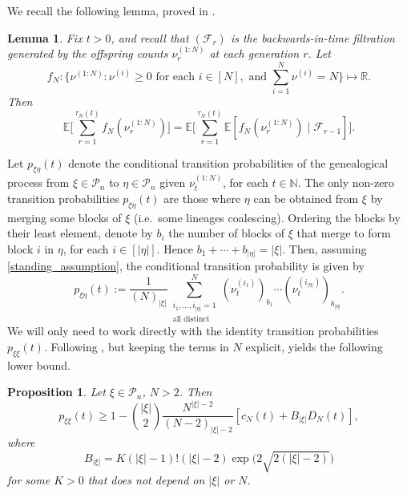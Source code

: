 \documentclass[12pt,authoryear]{article}
\newtheorem{lemma}{Lemma}
\newtheorem{prop}{Proposition}
\theoremstyle{definition}
\newcommand{\E}{\mathbb{E}}
\newcommand{\1}[1]{\mathbbm{1}_{#1}}
\begin{document}
We recall the following lemma, proved in \citet[Lemma 3.2]{brown2021thesis}.
\begin{lemma}\label{thm:kjjslemma2}
Fix $t>0$, and recall that $(\mathcal{F}_r)$ is the backwards-in-time filtration generated by the offspring counts $\nu_r^{(1:N)}$ at each generation $r$.
Let 
\begin{equation*}
    f_N : \Bigg\{ \nu^{(1:N)} : \nu^{(i)} \geq 0 \text{ for each } i \in [N], \text{ and } \sum_{ i = 1 }^N \nu^{(i)} = N \Bigg\} \mapsto \mathbb{R}.
\end{equation*}
Then 
\begin{equation*}
\E \Bigg[ \sum_{r=1}^{\tau_N(t)} f_N(\nu_r^{(1:N)}) \Bigg] 
= \E \Bigg[ \sum_{r=1}^{\tau_N(t)} \E [ f_N(\nu_r^{(1:N)}) \mid \mathcal{F}_{r-1} ] \Bigg] .
\end{equation*}
\end{lemma}

Let $p_{\xi\eta}(t)$ denote the conditional transition probabilities of the genealogical process from $\xi\in\mathcal{P}_n$ to $\eta\in\mathcal{P}_n$ given $\nu_t^{(1:N)}$, for each $t\in\mathbb{N}$.
The only non-zero transition probabilities $p_{\xi\eta}(t)$ are those where $\eta$ can be obtained from $\xi$ by merging some blocks of $\xi$ (i.e.\ some lineages coalescing).
Ordering the blocks by their least element, denote by $b_i$ the number of blocks of $\xi$ that merge to form block $i$ in $\eta$, for each $i \in [|\eta|]$. Hence $b_1 + \cdots + b_{|\eta|} = |\xi|$.
Then, assuming \ref{standing_assumption}, the conditional transition probability is given by
\begin{equation}\label{eq:defn_pxieta}
p_{\xi\eta}(t) 
:= \frac{1}{(N)_{|\xi|}} \sum_{\substack{i_1 , \ldots , i_{|\eta|} =1 
        \\ \text{all distinct} }}^N
        (\nu_t^{(i_1)})_{b_1} \cdots (\nu_t^{(i_{|\eta|})})_{b_{|\eta|}} .
\end{equation}
We will only need to work directly with the identity transition probabilities $p_{\xi\xi}(t)$.
Following \citet[Lemma 3.6]{brown2021}, but keeping the terms in $N$ explicit, yields the following lower bound.
\begin{prop}
\label{thm:pDelta_LB}
Let $\xi \in \mathcal{P}_n$, $N>2$. Then
\begin{equation*}
p_{\xi\xi}(t)
\geq 1 - \binom{|\xi|}{2} \frac{N^{|\xi|-2}}{(N-2)_{|\xi|-2}} \left[ c_N(t) + B_{|\xi|} D_N(t) \right],
\end{equation*}
where 
\begin{equation*}
B_{|\xi|} = K (|\xi|-1)! (|\xi|-2) \exp\big( 2 \sqrt{2(|\xi|-2)} \big)
\end{equation*}
for some $K>0$ that does not depend on $|\xi|$ or $N$.
\end{prop}
\end{document}
